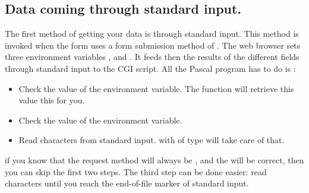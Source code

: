 \documentclass{report}
\begin{document}
%
%

\subsection{Data coming through standard input.}
The first method of getting your data is through standard input. This method
is invoked when the form uses a form submission method of .
The web browser sets three environment variables ,
 and . It feeds then the results of
the different fields through standard input to the CGI script.
All the Pascal program has to do is :
\begin{itemize}
\item Check the value of the  environment variable. The
 function will retrieve this value this for you.
\item Check the value of the  environment variable.
\item Read  characters from standard input.  with  of type  will take care of that.
\end{itemize}
if you know that the request method will always be , and the
 will be correct, then you can skip the first two steps.
The third step can be done easier: read characters until you reach the
end-of-file marker of standard input.
\end{document}
